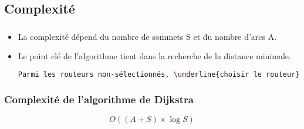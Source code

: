 \documentclass[svgnames,11pt]{beamer}
\begin{document}
\subsection{Complexité}
\begin{frame}[fragile]
    \frametitle{}

    \begin{itemize}
        \item<1->La complexité dépend du nombre de sommets S et du nombre d'arcs A.
        \item<2->Le point clé de l'algorithme tient dans la recherche de la distance minimale.
        \begin{center}
        \begin{lstlisting}[language=bash]
Parmi les routeurs non-sélectionnés, \underline{choisir le routeur} (noté S) ayant la plus petite distance.        
        \end{lstlisting}
        \end{center}
    \end{itemize}

\end{frame}

\begin{frame}
    \frametitle{Complexité de l'algorithme de Dijkstra}

    {\LARGE $$O((A+S)×\log{S})$$    }

\end{frame}
\end{document}
